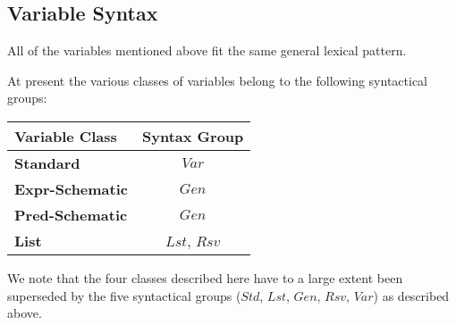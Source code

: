 \newpage
\subsection{Variable Syntax}

All of the variables mentioned above fit the same general lexical pattern.



At present the various classes of variables belong to the following
syntactical groups:

\begin{tabular}{|l|c|}
  \hline
  Variable Class & Syntax Group
\\\hline
  \textbf{Standard} & $Var$
\\\hline
  \textbf{Expr-Schematic} & $Gen$
\\\hline
  \textbf{Pred-Schematic} & $Gen$
\\\hline
  \textbf{List} & $Lst$, $Rsv$
\\\hline
\end{tabular}

We note that the four classes described here have to a large extent been
superseded by the five syntactical groups ($Std$, $Lst$, $Gen$, $Rsv$, $Var$) as described above.
